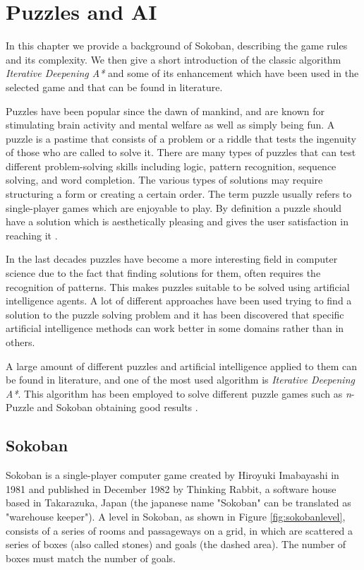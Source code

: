 \chapter{Puzzles and AI}
\label{puzzles}
In this chapter we provide a background of Sokoban, describing the game rules and its complexity. We then give a short introduction of the classic algorithm \textit{Iterative Deepening A*} and some of its enhancement which have been used in the selected game and that can be found in literature.

\medskip\noindent
Puzzles have been popular since the dawn of mankind, and are known for stimulating brain activity and mental welfare as well as simply being fun. A puzzle is a pastime that consists of a problem or a riddle that tests the ingenuity of those who are called to solve it. There are many types of puzzles that can test different problem-solving skills including logic, pattern recognition, sequence solving, and word completion. The various types of solutions may require structuring a form or creating a certain order. The term puzzle usually refers to single-player games which are enjoyable to play. By definition a puzzle should have a solution which is aesthetically pleasing and gives the user satisfaction in reaching it \cite{journals/icga/KendallPS08}.

\medskip\noindent
In the last decades puzzles have become a more interesting field in computer science due to the fact that finding solutions for them, often requires the recognition of patterns. This makes puzzles suitable to be solved using artificial intelligence agents. A lot of different approaches have been used trying to find a solution to the puzzle solving problem and it has been discovered that specific artificial intelligence methods can work better in some domains rather than in others.

\medskip\noindent
A large amount of different puzzles and artificial intelligence applied to them can be found in literature, and one of the most used algorithm is \textit{Iterative Deepening A*}. This algorithm has been employed to solve different puzzle games such as \textit{n}-Puzzle and Sokoban obtaining good results \cite{journals/icga/KendallPS08}.

\section{Sokoban}\label{sec:sokoban}
Sokoban is a single-player computer game created by Hiroyuki Imabayashi in 1981 and published in December 1982 by Thinking Rabbit, a software house based in Takarazuka, Japan (the japanese name "Sokoban" can be translated as "warehouse keeper"). A level in Sokoban, as shown in Figure \ref{fig:sokobanlevel}, consists of a series of rooms and passageways on a grid, in which are scattered a series of boxes (also called stones) and goals (the dashed area). The number of boxes must match the number of goals.

